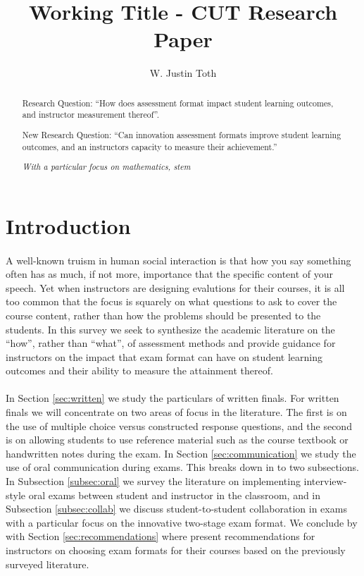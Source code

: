 \documentclass[12pt]{article}
\title{Working Title - CUT Research Paper}
\author{W. Justin Toth}
\begin{document}
\maketitle
\begin{abstract}
Research Question: ``How does assessment format impact student learning outcomes, and instructor measurement thereof''.

New Research Question: ``Can innovation assessment formats improve student learning outcomes, and an instructors capacity to measure their achievement.''

\textit{With a particular focus on mathematics, stem}
\end{abstract}

\section{Introduction}

\paragraph{}
A well-known truism in human social interaction is that how you say something often has as much, if not more, importance that the specific content of your speech. Yet when instructors are designing evalutions for their courses, it is all too common that the focus is squarely on what questions to ask to cover the course content, rather than how the problems should be presented to the students. In this survey we seek to synthesize the academic literature on the ``how'', rather than ``what'', of assessment methods and provide guidance for instructors on the impact that exam format can have on student learning outcomes and their ability to measure the attainment thereof.
\paragraph{}
In Section \ref{sec:written} we study the particulars of written finals. For written finals we will concentrate on two areas of focus in the literature. The first is on the use of multiple choice versus constructed response questions, and the second is on allowing students to use reference material such as the course textbook or handwritten notes during the exam. In Section \ref{sec:communication} we study the use of oral communication during exams. This breaks down in to two subsections. In Subsection \ref{subsec:oral} we survey the literature on implementing interview-style oral exams  between student and instructor in the classroom, and in Subsection \ref{subsec:collab} we discuss student-to-student collaboration in exams with a particular focus on the innovative two-stage exam format. We conclude by with Section \ref{sec:recommendations} where present recommendations for instructors on choosing exam formats for their courses based on the previously surveyed literature.
\end{document}
